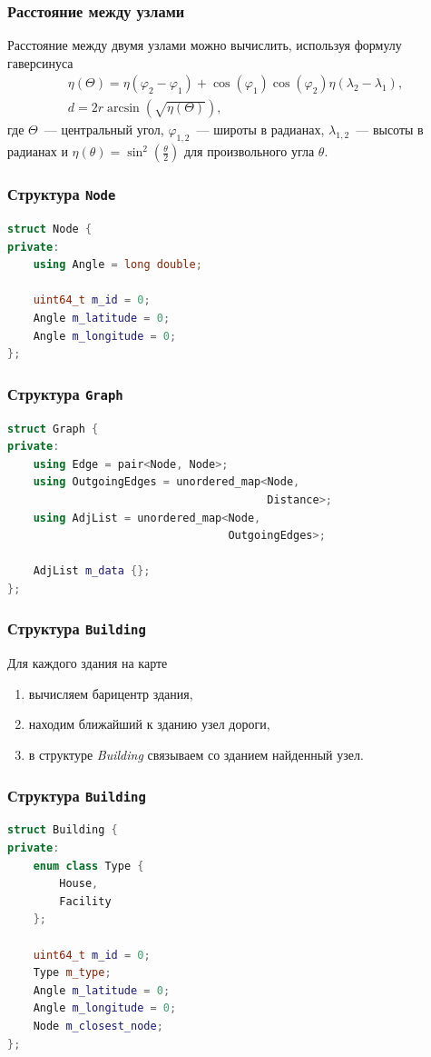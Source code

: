 \documentclass{beamer}
\begin{document}
\begin{frame}
\frametitle{Расстояние между узлами}
Расстояние между двумя узлами можно вычислить, используя формулу гаверсинуса
\begin{gather*}
	\eta(\Theta) = \eta(\varphi_2 - \varphi_1) + \cos(\varphi_1) \cos(\varphi_2) \eta(\lambda_2 - \lambda_1), \\
	d = 2r \arcsin(\sqrt{\eta(\Theta)}),
\end{gather*}
	где $ \Theta $~--- центральный угол, $ \varphi_{1,2} $~--- широты в радианах, $ \lambda_{1,2} $~--- высоты в радианах и $ \eta(\theta) = \sin^2\left(\frac{\theta}{2}\right) $ для произвольного угла $ \theta $.
\end{frame}

\begin{frame}[fragile]
\frametitle{Структура \texttt{Node}}
\begin{lstlisting}[language=C++]
struct Node {
private:
	using Angle = long double; 
	
	uint64_t m_id = 0;
	Angle m_latitude = 0;
	Angle m_longitude = 0;
};
\end{lstlisting} 	
\end{frame}

\begin{frame}[fragile]
\frametitle{Структура \texttt{Graph}}
\begin{lstlisting}[language=C++]
struct Graph {
private:
	using Edge = pair<Node, Node>;
	using OutgoingEdges = unordered_map<Node, 
										Distance>;
	using AdjList = unordered_map<Node, 
								  OutgoingEdges>;
	
	AdjList m_data {};
};
\end{lstlisting}
\end{frame}

\begin{frame}
\frametitle{Структура \texttt{Building}}
Для каждого здания на карте
\begin{enumerate}
\item вычисляем барицентр здания,
\item находим ближайший к зданию узел дороги,
\item в структуре \textit{Building} связываем со зданием найденный узел.
\end{enumerate}
\end{frame}

\begin{frame}[fragile]
\frametitle{Структура \texttt{Building}}
\begin{lstlisting}[language=C++]
struct Building {
private:
	enum class Type {
		House,
		Facility
	};

	uint64_t m_id = 0;
	Type m_type;
	Angle m_latitude = 0;
	Angle m_longitude = 0;
	Node m_closest_node;
};
\end{lstlisting}
\end{frame}
\end{document}
